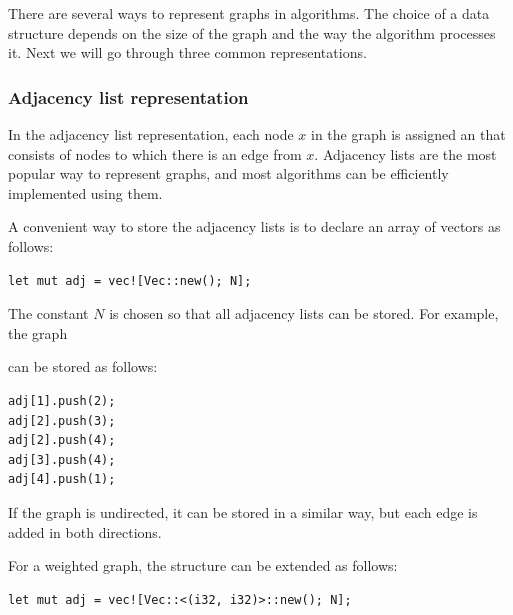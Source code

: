 There are several ways to represent graphs
in algorithms.
The choice of a data structure
depends on the size of the graph and
the way the algorithm processes it.
Next we will go through three common representations.

\subsubsection{Adjacency list representation}


In the adjacency list representation,
each node $x$ in the graph is assigned an 
that consists of nodes
to which there is an edge from $x$.
Adjacency lists are the most popular
way to represent graphs, and most algorithms can be
efficiently implemented using them.

A convenient way to store the adjacency lists is to declare
an array of vectors as follows:
\begin{lstlisting}
let mut adj = vec![Vec::new(); N];
\end{lstlisting}

The constant $N$ is chosen so that all
adjacency lists can be stored.
For example, the graph

\begin{center}
\end{center}
can be stored as follows:
\begin{lstlisting}
adj[1].push(2);
adj[2].push(3);
adj[2].push(4);
adj[3].push(4);
adj[4].push(1);
\end{lstlisting}

If the graph is undirected, it can be stored in a similar way,
but each edge is added in both directions.

For a weighted graph, the structure can be extended
as follows:

\begin{lstlisting}
let mut adj = vec![Vec::<(i32, i32)>::new(); N];
\end{lstlisting}

